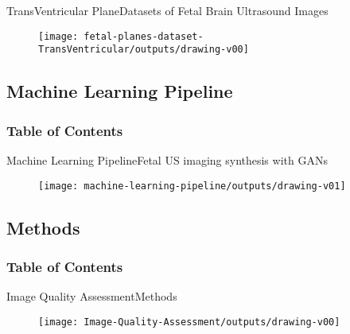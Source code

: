 {

\begin{frame}{TransVentricular Plane}{Datasets of Fetal Brain Ultrasound Images}
      \begin{figure}
        \centering
        \texttt{[image: fetal-planes-dataset-TransVentricular/outputs/drawing-v00]}
      \end{figure}
\end{frame}
}






\subsection{Machine Learning Pipeline}
\begin{frame}
  \frametitle{Table of Contents}
  \tableofcontents[currentsection]
\end{frame}

{
\begin{frame}{Machine Learning Pipeline}{Fetal US imaging synthesis with GANs}
      \begin{figure}
        \centering
        \texttt{[image: machine-learning-pipeline/outputs/drawing-v01]}
      \end{figure}
\end{frame}
}



\subsection{Methods}
\begin{frame}
  \frametitle{Table of Contents}
  \tableofcontents[currentsection]
\end{frame}


{
\begin{frame}{Image Quality Assessment}{Methods}
      \begin{figure}
        \centering
        \texttt{[image: Image-Quality-Assessment/outputs/drawing-v00]}
      \end{figure}
\end{frame}
}



